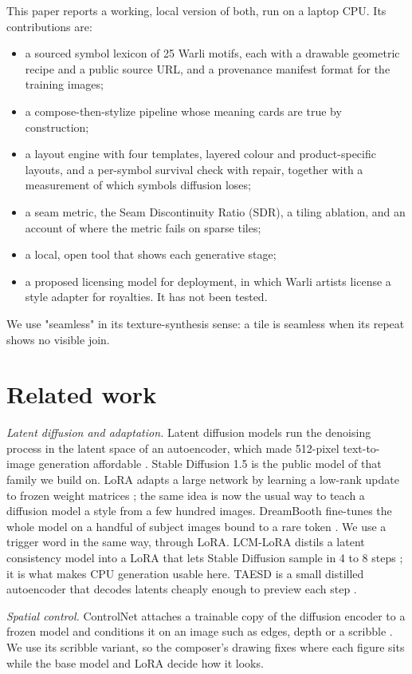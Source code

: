 \documentclass[conference]{IEEEtran}
\begin{document}
This paper reports a working, local version of both, run on a laptop CPU. Its contributions are:
\begin{itemize}
\item a sourced symbol lexicon of 25 Warli motifs, each with a drawable geometric recipe and a public source URL, and a provenance manifest format for the training images;
\item a compose-then-stylize pipeline whose meaning cards are true by construction;
\item a layout engine with four templates, layered colour and product-specific layouts, and a per-symbol survival check with repair, together with a measurement of which symbols diffusion loses;
\item a seam metric, the Seam Discontinuity Ratio (SDR), a tiling ablation, and an account of where the metric fails on sparse tiles;
\item a local, open tool that shows each generative stage;
\item a proposed licensing model for deployment, in which Warli artists license a style adapter for royalties. It has not been tested.
\end{itemize}
We use "seamless" in its texture-synthesis sense: a tile is seamless when its repeat shows no visible join.

\section{Related work}

\textit{Latent diffusion and adaptation.} Latent diffusion models run the denoising process in the latent space of an autoencoder, which made 512-pixel text-to-image generation affordable \cite{rombach2022ldm}. Stable Diffusion 1.5 is the public model of that family we build on. LoRA adapts a large network by learning a low-rank update to frozen weight matrices \cite{hu2022lora}; the same idea is now the usual way to teach a diffusion model a style from a few hundred images. DreamBooth fine-tunes the whole model on a handful of subject images bound to a rare token \cite{ruiz2023dreambooth}. We use a trigger word in the same way, through LoRA. LCM-LoRA distils a latent consistency model into a LoRA that lets Stable Diffusion sample in 4 to 8 steps \cite{luo2023lcmlora}; it is what makes CPU generation usable here. TAESD is a small distilled autoencoder that decodes latents cheaply enough to preview each step \cite{taesd}.

\textit{Spatial control.} ControlNet attaches a trainable copy of the diffusion encoder to a frozen model and conditions it on an image such as edges, depth or a scribble \cite{zhang2023controlnet}. We use its scribble variant, so the composer's drawing fixes where each figure sits while the base model and LoRA decide how it looks.
\end{document}
